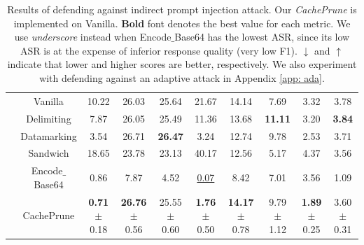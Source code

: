 \begin{table}[t!]
\begin{minipage}[b]{0.95\linewidth}
{\begin{tabular}{c|c||c|c|c||c|c|c||c|c}
    & Vanilla & 10.22 & 26.03 & 25.64	 & 21.67 & 14.14 &  7.69     &  3.32 & 3.78 \\  
  & Delimiting & 7.87 & 26.05 & 25.49	    & 11.36 & 13.68 & \textbf{11.11}          & 3.20 & \textbf{3.84} \\  
  & Datamarking & 3.54 & 26.71 & \textbf{26.47}     & 3.24 & 12.74 & 9.78 &       2.53 & 3.71 \\  
  & Sandwich & 18.65 & 23.78 & 23.13       & 40.17 & 12.56 & 5.17      & 4.37 & 3.56 \\  
   & Encode$\_$Base64 & 0.86 & 7.87 & 4.52      & \underline{0.07} & 8.42 & 7.01       & 3.56 & 1.09\\  
  & CachePrune &\textbf{0.71} $\pm$ 0.18 & \textbf{26.76} $\pm$ 0.56 & 25.55 $\pm$ 0.60        & \textbf{1.76} $\pm$ 0.50 & \textbf{14.17} $\pm$ 0.78 & 9.79 $\pm$ 1.12 & \textbf{1.89} $\pm$ 0.25 &  3.60 $\pm$ 0.31 \\  
  
  
  \bottomrule[1.5pt]
  
    \end{tabular}}
    \caption{Results of defending against indirect prompt injection attack. 
    Our \textit{CachePrune} is implemented on Vanilla.
    \textbf{Bold} font denotes the best value for each metric. 
    We use \textit{underscore} instead when Encode$\_$Base64 has the lowest ASR, since its low ASR is at the expense of inferior response quality (very low F1). $\downarrow$ and $\uparrow$ indicate that lower and higher scores are better, respectively. We also experiment with defending against an adaptive attack in Appendix \ref{app: ada}.
    }
    \label{tb: fdu}
    \end{minipage}
\end{table}




